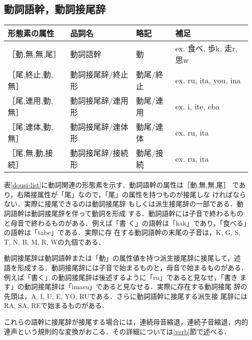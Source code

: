 \subsection{動詞語幹，動詞接尾辞}
\begin{table*}
\begin{center}
\begin{tabular}{|l|l|l|l|}
\hline
形態素の属性 & 品詞名 & 略記 & 補足 \\
\hline
［動,無,無,尾］   & 動詞語幹        & 動 & ex. 食べ, 歩k, 走r, 思w \\
\hline
［尾,終止,動,無］ & 動詞接尾辞/終止形 & 動尾/終止 & ex. ru, ita, you, ina \\
［尾,連用,動,無］ & 動詞接尾辞/連用形 & 動尾/連用 & ex. i, ite, eba \\
［尾,連体,動,無］ & 動詞接尾辞/連体形 & 動尾/連体 & ex. ru, ita \\
［尾,無,動,接続］ & 動詞接尾辞/接続形 & 動尾/接続 & ex. ru, ita \\
\hline
\end{tabular}
\end{center}
\caption{動詞語幹，動詞接尾辞}
\label{dousi-list}
\end{table*}

表\ref{dousi-list}に動詞関連の形態素を示す．動詞語幹の属性は［動,無,無,尾］
であり，右隣接属性が「尾」なので，「尾」の属性を持つものが接尾しな
ければならない．実際に接尾できるのは動詞接尾辞
もしくは派生接尾辞の一部である．動詞語幹は動詞接尾辞を伴って動詞を形成
する．動詞語幹には子音で終わるものと母音で終わるものがある．例えば「書
く」の語幹は「kak」であり，「食べる」の語幹は「tabe」である．実際に存
在する動詞語幹の末尾の子音は，K, G, S, T, N, B, M, R, Wの九個である．

動詞接尾辞は動詞語幹または「動」の属性値を持つ派生接尾辞に接尾して，述
語を形成する．動詞接尾辞には子音で始まるものと，母音で始まるものがある．
例えば「書く」の動詞接尾辞は後述するように「ru」であると見なせ，「書き
ます」の動詞接尾辞は「imasu」であると見なせる．実際に存在する動詞接尾
辞の先頭は，A, I, U, E, YO, RUである．さらに動詞語幹に接尾する派生接
尾辞にはRA, SA, REで始まるものがある．

これらの語幹に接尾辞が接尾する場合には，連続母音縮退，連続子音縮退，内的
連声という規則的な変換がおこる．その詳細については\ref{verb}節で述べる．

